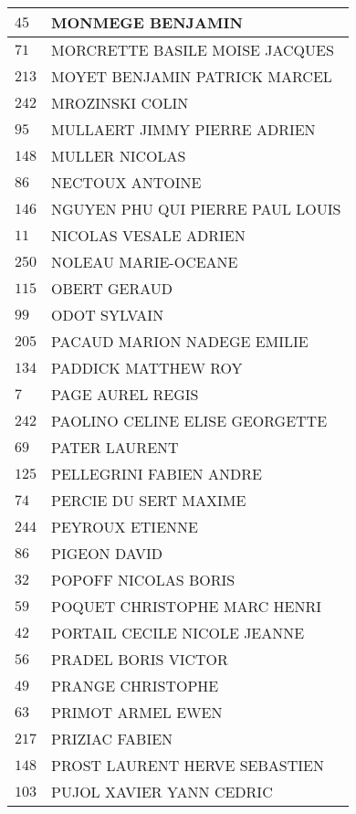 \begin{xltabular}{\linewidth}{|l|X|}
    \hline
    $45$ & MONMEGE BENJAMIN \\
    \hline
    $71$ & MORCRETTE BASILE MOISE JACQUES \\
    \hline
    $213$ & MOYET BENJAMIN PATRICK MARCEL \\
    \hline
    $242$ & MROZINSKI COLIN \\
    \hline
    $95$ & MULLAERT JIMMY PIERRE ADRIEN \\
    \hline
    $148$ & MULLER NICOLAS \\
    \hline
    $86$ & NECTOUX ANTOINE \\
    \hline
    $146$ & NGUYEN PHU QUI PIERRE PAUL LOUIS \\
    \hline
    $11$ & NICOLAS VESALE ADRIEN \\
    \hline
    $250$ & NOLEAU MARIE-OCEANE \\
    \hline
    $115$ & OBERT GERAUD \\
    \hline
    $99$ & ODOT SYLVAIN \\
    \hline
    $205$ & PACAUD MARION NADEGE EMILIE \\
    \hline
    $134$ & PADDICK MATTHEW ROY \\
    \hline
    $7$ & PAGE AUREL REGIS \\
    \hline
    $242$ & PAOLINO CELINE ELISE GEORGETTE \\
    \hline
    $69$ & PATER LAURENT \\
    \hline
    $125$ & PELLEGRINI FABIEN ANDRE \\
    \hline
    $74$ & PERCIE DU SERT MAXIME \\
    \hline
    $244$ & PEYROUX ETIENNE \\
    \hline
    $86$ & PIGEON DAVID \\
    \hline
    $32$ & POPOFF NICOLAS BORIS \\
    \hline
    $59$ & POQUET CHRISTOPHE MARC HENRI \\
    \hline
    $42$ & PORTAIL CECILE NICOLE JEANNE \\
    \hline
    $56$ & PRADEL BORIS VICTOR \\
    \hline
    $49$ & PRANGE CHRISTOPHE \\
    \hline
    $63$ & PRIMOT ARMEL EWEN \\
    \hline
    $217$ & PRIZIAC FABIEN \\
    \hline
    $148$ & PROST LAURENT HERVE SEBASTIEN \\
    \hline
    $103$ & PUJOL XAVIER YANN CEDRIC \\

\end{xltabular}
